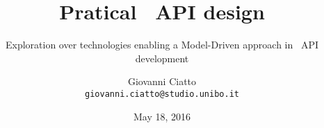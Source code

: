 \documentclass{beamer}
\title{Pratical \restful\ API design}
\subtitle{Exploration over technologies enabling a Model-Driven approach in \restful\ API development}
\author[G. Ciatto]{Giovanni Ciatto \\ \texttt{giovanni.ciatto@studio.unibo.it}}
\date{May 18, 2016}
\institute[UNIBO]{University of Bologna \\ Computer Science and Engineering}
\begin{document}
\frame{\titlepage}




\end{document}
